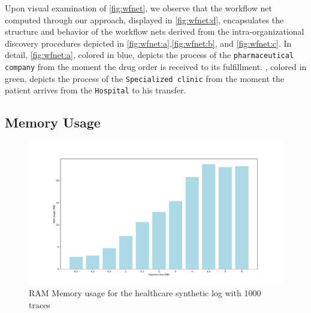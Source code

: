Upon visual examination of \cref{fig:wfnet}, we observe that the workflow net computed through our approach, displayed in \cref{fig:wfnet:d}, encapsulates the structure and behavior of the workflow nets derived from the intra-organizational discovery procedures depicted in \cref{fig:wfnet:a},\cref{fig:wfnet:b}, and \cref{fig:wfnet:c}. %
In detail, \cref{fig:wfnet:a}, colored in blue, depicts the process of the \texttt{pharmaceutical company} from the moment the drug order is received to its fulfillment. , colored in green, depicts the process of the \texttt{Specialized clinic} from the moment the patient arrives from the \texttt{Hospital} to his transfer.



\subsection{Memory Usage}
\label{sec:discussion:subsec:memory}

\begin{figure}[t]
\centering
\includegraphics[width=1\linewidth]{content/figures/barplot_segsize.pdf}
\caption{RAM Memory usage for the healthcare synthetic log with 1000 traces}
\label{fig:barplot_segsize}
\end{figure}

